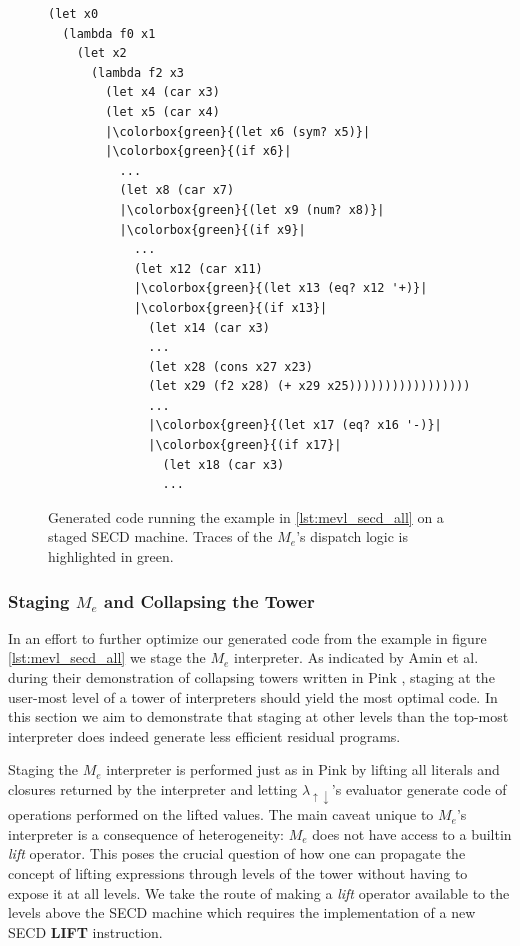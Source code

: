 \documentclass[a4paper,12pt,twoside,openright]{report}
\theoremstyle{definition}
\newcommand{\mslang}{$\lambda_{\uparrow\downarrow}$}
\newcommand{\mevl}{$M_{e}$}
\begin{document}
\begin{figure}[htp!]
\centering
    \begin{verbatim}
(let x0
  (lambda f0 x1
    (let x2
      (lambda f2 x3
        (let x4 (car x3)
        (let x5 (car x4)
        |\colorbox{green}{(let x6 (sym? x5)}|
        |\colorbox{green}{(if x6}|
          ...
          (let x8 (car x7)
          |\colorbox{green}{(let x9 (num? x8)}|
          |\colorbox{green}{(if x9}|
            ...
            (let x12 (car x11)
            |\colorbox{green}{(let x13 (eq? x12 '+)}|
            |\colorbox{green}{(if x13}|
              (let x14 (car x3)
              ...
              (let x28 (cons x27 x23)
              (let x29 (f2 x28) (+ x29 x25)))))))))))))))))
              ...
              |\colorbox{green}{(let x17 (eq? x16 '-)}|
              |\colorbox{green}{(if x17}|
                (let x18 (car x3)
                ...
    \end{verbatim}
\caption{Generated code running the example in \ref{lst:mevl_secd_all} on a staged SECD machine. Traces of the \mevl's dispatch logic is highlighted in green.}
\label{lst:mevl_secd_ped}
\end{figure}
\pagebreak

\subsubsection{Staging \texorpdfstring{\mevl}{Lg} and Collapsing the Tower}\label{ssubsec:mevl_staged}
In an effort to further optimize our generated code from the example in figure \ref{lst:mevl_secd_all} we stage the \mevl{} interpreter. As indicated by Amin et al. during their demonstration of collapsing towers written in Pink \cite{amin2017collapsing}, staging at the user-most level of a tower of interpreters should yield the most optimal code. In this section we aim to demonstrate that staging at other levels than the top-most interpreter does indeed generate less efficient residual programs.

Staging the \mevl{} interpreter is performed just as in Pink \cite{amin2017collapsing} by lifting all literals and closures returned by the interpreter and letting \mslang's evaluator generate code of operations performed on the lifted values. The main caveat unique to \mevl's interpreter is a consequence of heterogeneity: \mevl{} does not have access to a builtin \textit{lift} operator. This poses the crucial question of how one can propagate the concept of lifting expressions through levels of the tower without having to expose it at all levels. We take the route of making a \textit{lift} operator available to the levels above the SECD machine which requires the implementation of a new SECD \textbf{LIFT} instruction.
\end{document}
